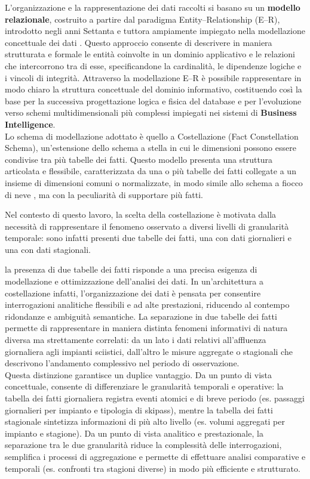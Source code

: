 L’organizzazione e la rappresentazione dei dati raccolti si basano su un \textbf{modello relazionale}, costruito a partire dal paradigma Entity–Relationship (E–R), introdotto negli anni Settanta e tuttora ampiamente impiegato nella modellazione concettuale dei dati \cite{ER_Model}.
Questo approccio consente di descrivere in maniera strutturata e formale le entità coinvolte in un dominio applicativo e le relazioni che intercorrono tra di esse, specificandone la cardinalità, le dipendenze logiche e i vincoli di integrità.
Attraverso la modellazione E–R è possibile rappresentare in modo chiaro la struttura concettuale del dominio informativo, costituendo così la base per la successiva progettazione logica e fisica del database e per l’evoluzione verso schemi multidimensionali più complessi impiegati nei sistemi di \textbf{Business Intelligence}. \\

Lo schema di modellazione adottato è quello a Costellazione (Fact Constellation Schema), un’estensione dello schema a stella in cui le dimensioni possono essere condivise tra più tabelle dei fatti. Questo modello presenta una struttura articolata e flessibile, caratterizzata da una o più tabelle dei fatti collegate a un insieme di dimensioni comuni o normalizzate, in modo simile allo schema a fiocco di neve \cite{databricks_Snowflake}, ma con la peculiarità di supportare più fatti.

Nel contesto di questo lavoro, la scelta della costellazione è motivata dalla necessità di rappresentare il fenomeno osservato a diversi livelli di granularità temporale: sono infatti presenti due tabelle dei fatti, una con dati giornalieri e una con dati stagionali. 

la presenza di due tabelle dei fatti risponde a una precisa esigenza di modellazione e ottimizzazione dell’analisi dei dati.
In un’architettura a costellazione infatti, l’organizzazione dei dati è pensata per consentire interrogazioni analitiche flessibili e ad alte prestazioni, riducendo al contempo ridondanze e ambiguità semantiche. La separazione in due tabelle dei fatti permette di rappresentare in maniera distinta fenomeni informativi di natura diversa ma strettamente correlati: da un lato i dati relativi all’affluenza giornaliera agli impianti sciistici, dall’altro le misure aggregate o stagionali che descrivono l’andamento complessivo nel periodo di osservazione.\\

Questa distinzione garantisce un duplice vantaggio. Da un punto di vista concettuale, consente di differenziare le granularità temporali e operative: la tabella dei fatti giornaliera registra eventi atomici e di breve periodo (es. passaggi giornalieri per impianto e tipologia di skipass), mentre la tabella dei fatti stagionale sintetizza informazioni di più alto livello (es. volumi aggregati per impianto e stagione). Da un punto di vista analitico e prestazionale, la separazione tra le due granularità riduce la complessità delle interrogazioni, semplifica i processi di aggregazione e permette di effettuare analisi comparative e temporali (es. confronti tra stagioni diverse) in modo più efficiente e strutturato.\\


